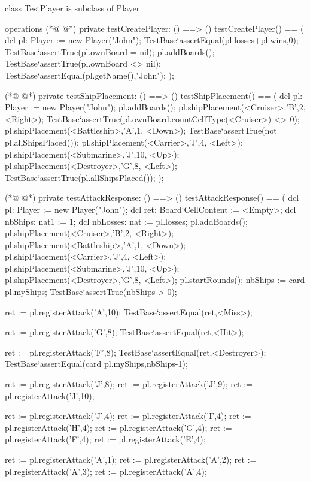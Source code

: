 \begin{vdmpp}[breaklines=true]
class TestPlayer is subclass of Player

operations
(*@
\label{testCreatePlayer:4}
@*)
 private testCreatePlayer: () ==> ()
  testCreatePlayer() == (
  dcl pl: Player := new Player("John");
  TestBase`assertEqual(pl.losses+pl.wins,0);
  TestBase`assertTrue(pl.ownBoard = nil);
  pl.addBoards();
  TestBase`assertTrue(pl.ownBoard <> nil);
  TestBase`assertEqual(pl.getName(),"John");
 );
 
(*@
\label{testShipPlacement:14}
@*)
 private testShipPlacement: () ==> ()
  testShipPlacement() == (
  dcl pl: Player := new Player("John");
  pl.addBoards();
  pl.shipPlacement(<Cruiser>,'B',2, <Right>);
  TestBase`assertTrue(pl.ownBoard.countCellType(<Cruiser>) <> 0);
  pl.shipPlacement(<Battleship>,'A',1, <Down>);
  TestBase`assertTrue(not pl.allShipsPlaced());
  pl.shipPlacement(<Carrier>,'J',4, <Left>);
  pl.shipPlacement(<Submarine>,'J',10, <Up>);
  pl.shipPlacement(<Destroyer>,'G',8, <Left>);
  TestBase`assertTrue(pl.allShipsPlaced());
 );
 
(*@
\label{testAttackResponse:28}
@*)
 private testAttackResponse: () ==> ()
  testAttackResponse() == (
   dcl pl: Player := new Player("John");
   dcl ret: Board`CellContent := <Empty>;
   dcl nbShips: nat1 := 1;
   dcl nbLosses: nat := pl.losses;
   pl.addBoards();
   pl.shipPlacement(<Cruiser>,'B',2, <Right>);
   pl.shipPlacement(<Battleship>,'A',1, <Down>);
   pl.shipPlacement(<Carrier>,'J',4, <Left>);
   pl.shipPlacement(<Submarine>,'J',10, <Up>);
   pl.shipPlacement(<Destroyer>,'G',8, <Left>);
   pl.startRounds();
   nbShips := card pl.myShips;
   TestBase`assertTrue(nbShips > 0);
   
   ret := pl.registerAttack('A',10);
   TestBase`assertEqual(ret,<Miss>);
   
   ret := pl.registerAttack('G',8);
   TestBase`assertEqual(ret,<Hit>);
   
   ret := pl.registerAttack('F',8);
   TestBase`assertEqual(ret,<Destroyer>);
   TestBase`assertEqual(card pl.myShips,nbShips-1);
   
   ret := pl.registerAttack('J',8);
   ret := pl.registerAttack('J',9);
   ret := pl.registerAttack('J',10);
   
   ret := pl.registerAttack('J',4);
   ret := pl.registerAttack('I',4);
   ret := pl.registerAttack('H',4);
   ret := pl.registerAttack('G',4);
   ret := pl.registerAttack('F',4);
   ret := pl.registerAttack('E',4);
   
   ret := pl.registerAttack('A',1);
   ret := pl.registerAttack('A',2);
    ret := pl.registerAttack('A',3);
   ret := pl.registerAttack('A',4);
   

\end{vdmpp}
